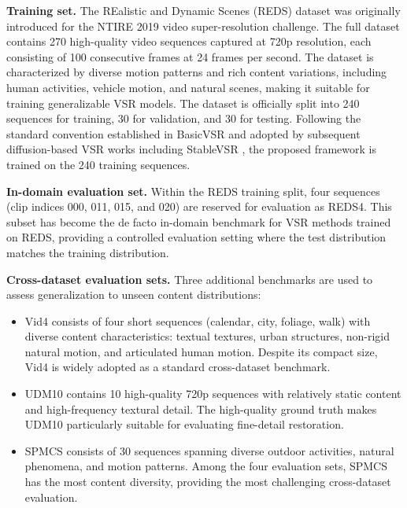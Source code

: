 \textbf{Training set.} The REalistic and Dynamic Scenes (REDS) 
dataset \cite{nah2019reds} was originally introduced for the 
NTIRE 2019 video super-resolution challenge. The full dataset 
contains 270 high-quality video sequences captured at 720p 
resolution, each consisting of 100 consecutive frames at 24 
frames per second. The dataset is characterized by diverse 
motion patterns and rich content variations, including human 
activities, vehicle motion, and natural scenes, making it 
suitable for training generalizable VSR models. The dataset is 
officially split into 240 sequences for training, 30 for 
validation, and 30 for testing. Following the standard 
convention established in BasicVSR \cite{chan2021basicvsr} and 
adopted by subsequent diffusion-based VSR works including 
StableVSR \cite{rota2024stablevsr}, the proposed framework is 
trained on the 240 training sequences.

\textbf{In-domain evaluation set.} Within the REDS training 
split, four sequences (clip indices 000, 011, 015, and 020) are 
reserved for evaluation as REDS4. This subset has become the de 
facto in-domain benchmark for VSR methods trained on REDS, 
providing a controlled evaluation setting where the test 
distribution matches the training distribution.

\textbf{Cross-dataset evaluation sets.} Three additional 
benchmarks are used to assess generalization to unseen content 
distributions:

\begin{itemize}
    \item Vid4 \cite{liu2013vid4} consists of four short 
    sequences (calendar, city, foliage, walk) with diverse 
    content characteristics: textual textures, urban structures, 
    non-rigid natural motion, and articulated human motion. 
    Despite its compact size, Vid4 is widely adopted as a 
    standard cross-dataset benchmark.
    \item UDM10 \cite{yi2019udm10} contains 10 high-quality 720p 
    sequences with relatively static content and high-frequency 
    textural detail. The high-quality ground truth makes UDM10 
    particularly suitable for evaluating fine-detail restoration.
    \item SPMCS \cite{tao2017spmcs} consists of 30 sequences spanning diverse outdoor activities, natural phenomena, and 
    motion patterns. Among the four evaluation sets, SPMCS has 
    the most content diversity, providing the most challenging 
    cross-dataset evaluation.
\end{itemize}


